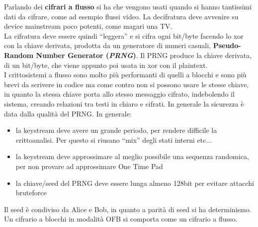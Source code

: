 \documentclass[a4paper,12pt, oneside]{book}
\begin{document}
Parlando dei \textbf{cifrari a flusso} si ha che vengono usati quando si hanno
tantissimi dati da cifrare, come ad esempio flussi video. La decifratura deve
avvenire su device mainstream poco potenti, come magari una TV.\\
La cifratura deve essere quindi ``leggera'' e si cifra ogni bit/byte facendo lo
xor con la chiave derivata, prodotta da un generatore di numeri casuali,
\textbf{Pseudo-Random Number Generator (\textit{PRNG})}. Il PRNG produce la
chiave derivata, di un bit/byte, che viene appunto poi usata in xor con il
plaintext.\\
I crittosistemi a flusso sono molto più performanti di quelli a blocchi e sono
più brevi da scrivere in codice ma come contro non si possono usare le stesse
chiave, in quanto la stessa chiave porta allo stesso messaggio cifrato,
indebolendo il sistema, creando relazioni tra testi in chiaro e cifrati. In
generale la sicurezza è data dalla qualità del PRNG. In generale:
\begin{itemize}
  \item la keystream deve avere un grande periodo, per rendere difficile la
  crittoanalisi. Per questo si riusano ``mix'' degli stati interni etc$\ldots$
  \item la keystream deve approssimare al meglio possibile una sequenza
  randomica, per non provare ad approssimare One Time Pad
  \item la chiave/seed del PRNG deve essere lunga almeno 128bit per evitare
  attacchi bruteforce
\end{itemize}
Il seed è condiviso da Alice e Bob, in quanto a parità di seed si ha
determinismo.\\  
Un cifrario a blocchi in modalità OFB si comporta come un cifrario a flusso.\\
\end{document}
